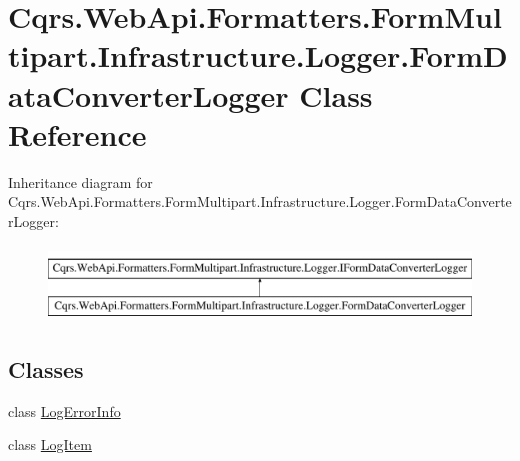 \hypertarget{classCqrs_1_1WebApi_1_1Formatters_1_1FormMultipart_1_1Infrastructure_1_1Logger_1_1FormDataConverterLogger}{}\section{Cqrs.\+Web\+Api.\+Formatters.\+Form\+Multipart.\+Infrastructure.\+Logger.\+Form\+Data\+Converter\+Logger Class Reference}
\label{classCqrs_1_1WebApi_1_1Formatters_1_1FormMultipart_1_1Infrastructure_1_1Logger_1_1FormDataConverterLogger}
Inheritance diagram for Cqrs.\+Web\+Api.\+Formatters.\+Form\+Multipart.\+Infrastructure.\+Logger.\+Form\+Data\+Converter\+Logger\+:\begin{figure}[H]
\begin{center}
\leavevmode
\includegraphics[height=2.000000cm]{classCqrs_1_1WebApi_1_1Formatters_1_1FormMultipart_1_1Infrastructure_1_1Logger_1_1FormDataConverterLogger}
\end{center}
\end{figure}
\subsection*{Classes}
\begin{DoxyCompactItemize}
\item 
class \hyperlink{classCqrs_1_1WebApi_1_1Formatters_1_1FormMultipart_1_1Infrastructure_1_1Logger_1_1FormDataConverterLogger_1_1LogErrorInfo}{Log\+Error\+Info}
\item 
class \hyperlink{classCqrs_1_1WebApi_1_1Formatters_1_1FormMultipart_1_1Infrastructure_1_1Logger_1_1FormDataConverterLogger_1_1LogItem}{Log\+Item}
\end{DoxyCompactItemize}
